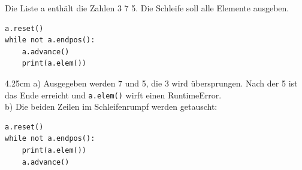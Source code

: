 \question[3]
Die Liste a enthält die Zahlen 3 7 5. Die Schleife soll alle Elemente ausgeben.
\begin{lstlisting}
a.reset()
while not a.endpos():
    a.advance()
    print(a.elem())
\end{lstlisting}
\begin{solutionbox}{4.25cm}
a) Ausgegeben werden 7 und 5, die 3 wird übersprungen. Nach der 5 ist das Ende erreicht und \texttt{a.elem()} wirft
einen RuntimeError. \\
b) Die beiden Zeilen im Schleifenrumpf werden getauscht:
\begin{lstlisting}
a.reset()
while not a.endpos():
    print(a.elem())
    a.advance()
\end{lstlisting}
\end{solutionbox}
